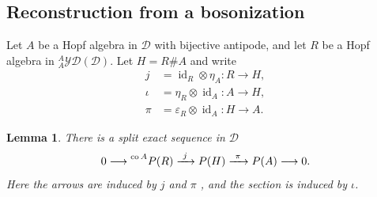 \documentclass[11pt, a4paper]{article}
\numberwithin{equation}{section}
\newcommand{\D}{\mathcal D}
\newcommand{\YD}{\mathcal{YD}}
\DeclareMathOperator{\id}{id}
\DeclareMathOperator{\co}{co}
\newtheorem{lemma}[theorem]{Lemma}
\begin{document}
\subsection{Reconstruction from a bosonization}

Let $A$ be a Hopf algebra in $\D$ with bijective antipode, and let
$R$ be a Hopf algebra in
${}^{A}_{A}\YD(\D)$.  { Let} $H=R\#A$  {and write}
\[
 \begin{aligned}
 j&  =\id_R\otimes\eta_A   :R\longrightarrow H,\\
 \iota&  =\eta_R\otimes\id_A   :A\longrightarrow H,\\
 \pi&  =\varepsilon_R\otimes\id_A   :H\longrightarrow A.
 \end{aligned}
\]
\begin{lemma}\label{refl:primitive-splitting}
There is a split exact sequence in $\D$
\[
 0\longrightarrow\prescript{\co A}{}{P(R)}
 \xrightarrow{\ j\ }P(H)
 \xrightarrow{\ \pi\ }P(A)\longrightarrow0.
\]
 {Here the arrows are induced by} $  j   $  {and} $  \pi   $ {, and the section
is induced by} $  \iota   $.
\end{lemma}
\end{document}
